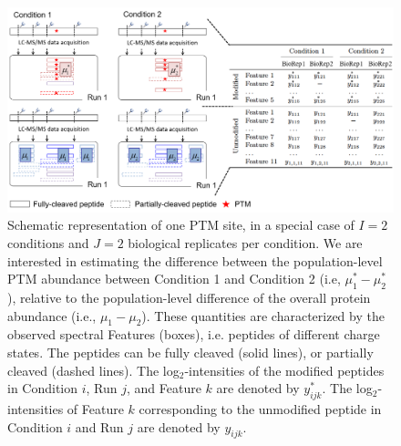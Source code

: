 \documentclass[mcp]{article}
\numberwithin{table}{section}
\begin{document}
\begin{figure}[ht]
\centering
\includegraphics[scale=.45]{images/fig3.png}
\caption{Schematic representation of one PTM site, in a special case of $I=2$ conditions and $J=2$ biological replicates per condition. We are interested in estimating the difference between the population-level PTM abundance between Condition 1 and Condition 2 (i.e, $\mu^*_1-\mu^*_2$), relative to the population-level difference of the overall protein abundance (i.e., $\mu_1-\mu_2$).  These quantities are characterized by the observed spectral Features (boxes), i.e. peptides of different charge states. The peptides can be fully cleaved (solid lines), or partially cleaved (dashed lines). The log$_2$-intensities of the modified peptides in Condition $i$, Run $j$, and Feature $k$ are denoted by $y_{ijk}^{\ast}$. The log$_2$-intensities of Feature $k$ corresponding to the unmodified peptide in Condition $i$ and Run $j$ are denoted by $y_{ijk}$. }
\label{fig:data-structure}
\end{figure}
\end{document}
